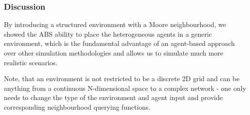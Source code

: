 \subsubsection{Discussion}
By introducing a structured environment with a Moore neighbourhood, we showed the ABS ability to place the heterogeneous agents in a generic environment, which is the fundamental advantage of an agent-based approach over other simulation methodologies and allows us to simulate much more realistic scenarios.

Note, that an environment is not restricted to be a discrete 2D grid and can be anything from a continuous N-dimensional space to a complex network - one only needs to change the type of the environment and agent input and provide corresponding neighbourhood querying functions. 